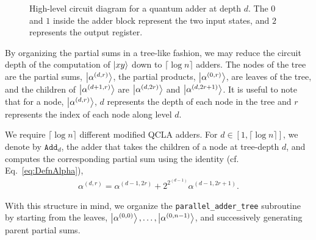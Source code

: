 \documentclass[reprint,amsmath,amssymb,aps,pra]{revtex4-2}
\begin{document}
\begin{figure}[h]
    \centering
    \caption{High-level circuit diagram for a quantum adder at depth $d$. The $0$ and $1$ inside the adder block represent the two input states, and $2$ represents the output register.}
    \label{fig:adder}
\end{figure}

By organizing the partial sums in a tree-like fashion, we may reduce the circuit
depth of the computation of $\ket{xy}$ down to $\lceil \log n\rceil$ 
adders.
%
%
The nodes of the tree are the partial sums,
$\ket{\alpha^{(d,r)}}$,
the partial products, $\ket{\alpha^{(0,r)}}$, are leaves of
the tree, and the children of 
$\ket{\alpha^{(d+1,r)}}$ 
are
$\ket{\alpha^{(d,2r)}}$  
and
$\ket{\alpha^{(d,2r+1)}}$.
It is useful to note that for a node, $\ket{\alpha^{(d,r)}}$, $d$ represents the depth of each node in the tree and $r$ represents the index of each node along level $d$.  

We require $\lceil \log n \rceil$ different modified QCLA adders.
For $d \in [1,\lceil\log n\rceil]$,
we denote by $\texttt{Add}_{d}$,
the adder that takes the children of a node at tree-depth $d$,
and computes the corresponding partial sum using the identity
(cf. Eq.~\eqref{eq:DefnAlpha}),
\begin{align}
    {\alpha^{(d,r)}} = {\alpha^{(d-1,2r)} + 2^{2^{(d-1)}}\alpha^{(d-1,2r+1)}}.
    \label{eq9}
\end{align}

With this structure in mind, 
we organize the \texttt{parallel\_adder\_tree} subroutine 
by starting from the leaves,
$\ket{\alpha^{(0,0)}},\dots,\ket{\alpha^{(0,n-1)}}$,
and successively generating parent partial sums.
\end{document}
